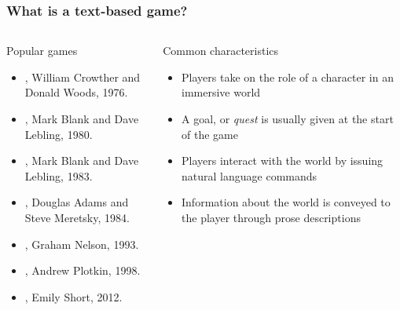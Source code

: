 \begin{frame}

    \frametitle{What is a text-based game?}
    \begin{columns}
        \begin{block}{Popular games}
            {\footnotesize
            \begin{itemize}
                \item {}, William Crowther and Donald
                    Woods, 1976.
                \item {}, Mark Blank and Dave Lebling, 1980.
                \item {}, Mark Blank and Dave Lebling,
                    1983.
                \item {},
                    Douglas Adams and Steve Meretsky, 1984.
                \item {}, Graham Nelson, 1993.
                \item {}, Andrew Plotkin, 1998.
                \item {}, Emily Short, 2012.
            \end{itemize}
            \parencite{interactive_fiction_technology_foundation_interactive_nodate}
        }
        \end{block}

        \begin{block}{Common characteristics}
            \begin{itemize}
                \item Players take on the role of a character in an
                    immersive world
                \item A goal, or \emph{quest} is usually given at the
                    start of the game
                \item Players interact with the world by issuing natural
                    language commands
                \item Information about the world is conveyed to the
                    player through prose descriptions
            \end{itemize}
        \end{block}
    \end{columns}

\end{frame}

